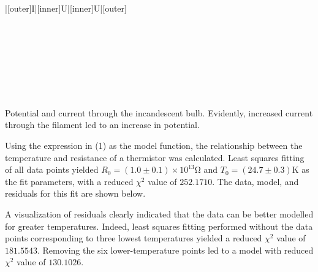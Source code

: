 \begin{paper}
{\begin{papertable}{|[outer]I|[inner]U|[inner]U|[outer]}
			\papertableindex{}\\\paperiline
			\papertableindex{}\\\paperiline
			\papertableindex{}\\\paperiline
			\papertableindex{}\\\paperiline
			\papertableindex{}\\\paperiline
			\papertableindex{}\\\paperiline
			\papertableindex{}\\\paperiline
			\papertableindex{}\\\paperoline
			\end{papertable}\vspace{-1.5em}}
	{Potential and current through the incandescent bulb. Evidently, increased current through the filament led to an increase in potential.} \vspace{1em}


	Using the expression in (1) as the model function, the relationship between the temperature and resistance of a thermistor was calculated. Least squares fitting of all data points yielded \( R_0 = (1.0 \pm 0.1) \times 10^{13} \si{\ohm} \) and \( T_0 = (24.7 \pm 0.3) \si{\kelvin} \) as the fit parameters, with a reduced \( \chi ^ 2 \) value of \( 252.1710 \). The data, model, and residuals for this fit are shown below.
	
	 \vspace{1em}

	A visualization of residuals clearly indicated that the data can be better modelled for greater temperatures. Indeed, least squares fitting performed without the data points corresponding to three lowest temperatures yielded a reduced \( \chi ^ 2 \) value of \( 181.5543 \). Removing the six lower-temperature points led to a model with reduced \( \chi ^ 2 \) value of \( 130.1026 \). 
	

\end{paper}
